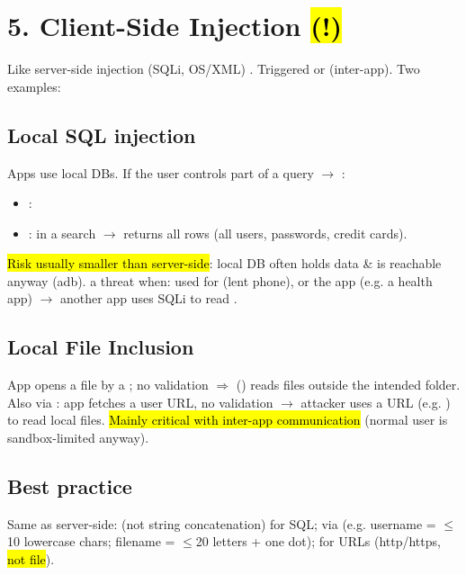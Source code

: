 \section{5. Client-Side Injection \hl{(!)}}
Like server-side injection (SQLi, OS/XML) . Triggered  or  (inter-app). Two examples:
\subsection{Local SQL injection}
Apps use local  DBs. If the user controls part of a query $\to$ :
\begin{itemize}
\item {}: 
\item {}:  in a search $\to$ returns all rows (all users, passwords, credit cards).
\end{itemize}
\hl{Risk usually smaller than server-side}: local DB often holds data  \& is reachable anyway (adb).  a threat when: used for  (lent phone), or the app  (e.g. a health app) $\to$ another app uses SQLi to read .
\subsection{Local File Inclusion}
App opens a file by a ; no validation $\Rightarrow$  () reads files outside the intended folder. Also via : app fetches a user URL, no validation $\to$ attacker uses a  URL (e.g. ) to read local files. \hl{Mainly critical with inter-app communication} (normal user is sandbox-limited anyway).
\subsection{Best practice}
Same as server-side:  (not string concatenation) for SQL;  via  (e.g. username = $\le$10 lowercase chars; filename = $\le$20 letters + one dot); for URLs  (http/https, \hl{not file}).

